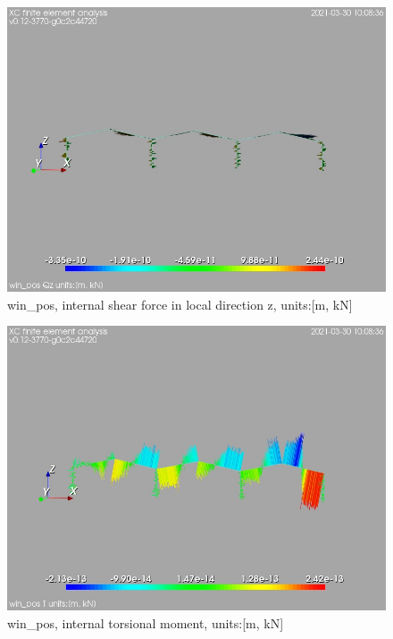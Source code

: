 \begin{figure}
\begin{center}
\includegraphics[width=\linewidth]{calc_results/sole_zeinali/text/graphics/resSimplLC/win_posallMemberSetQz}
\caption{win_pos, internal shear force in local direction z, units:[m, kN]}
\end{center}
\end{figure}
\begin{figure}
\begin{center}
\includegraphics[width=\linewidth]{calc_results/sole_zeinali/text/graphics/resSimplLC/win_posallMemberSetT}
\caption{win_pos, internal torsional moment, units:[m, kN]}
\end{center}
\end{figure}
